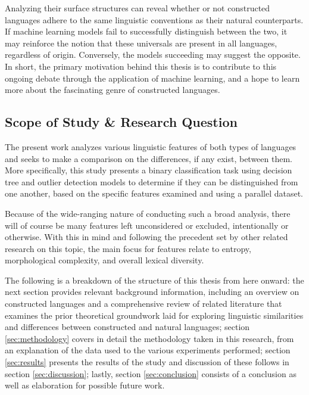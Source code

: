 \documentclass[12pt,a4paper]{article}
\numberwithin{figure}{section}
\numberwithin{table}{section}
\numberwithin{definition}{section}
\begin{document}
Analyzing their surface structures can reveal whether or not constructed languages adhere to the same linguistic conventions as their natural counterparts. If machine learning models fail to successfully distinguish between the two, it may reinforce the notion that these universals are present in all languages, regardless of origin. Conversely, the models succeeding may suggest the opposite. In short, the primary motivation behind this thesis is to contribute to this ongoing debate through the application of machine learning, and a hope to learn more about the fascinating genre of constructed languages.


\subsection{Scope of Study \& Research Question}
\label{ssec:scope}


The present work analyzes various linguistic features of both types of languages and seeks to make a comparison on the differences, if any exist, between them. More specifically, this study presents a binary classification task using decision tree and outlier detection models to determine if they can be distinguished from one another, based on the specific features examined and using a parallel dataset. 

Because of the wide-ranging nature of conducting such a broad analysis, there will of course be many features left unconsidered or excluded, intentionally or otherwise. With this in mind and following the precedent set by other related research on this topic, the main focus for features relate to entropy, morphological complexity, and overall lexical diversity.

The following is a breakdown of the structure of this thesis from here onward: the next section provides relevant background information, including an overview on constructed languages and a comprehensive review of related literature that examines the prior theoretical groundwork laid for exploring linguistic similarities and differences between constructed and natural languages; section \ref{sec:methodology} covers in detail the methodology taken in this research, from an explanation of the data used to the various experiments performed; section \ref{sec:results} presents the results of the study and discussion of these follows in section \ref{sec:discussion}; lastly, section \ref{sec:conclusion} consists of a conclusion as well as elaboration for possible future work.
\end{document}
